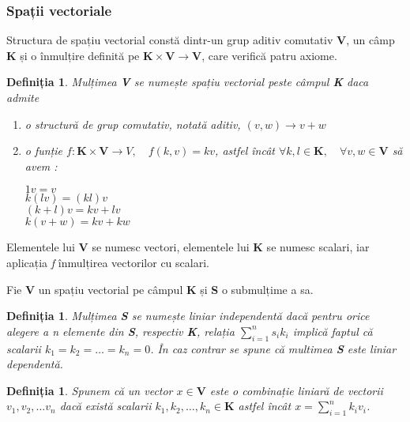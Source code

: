 \subsubsection{Spații vectoriale}
\label{ch1:sec_vectors:sub_vector_spaces:sub_sub_vectorspaces}
Structura de spațiu vectorial constă dintr-un grup aditiv comutativ \textbf{V},
un câmp \textbf{K} și o înmulțire definită pe $\mathbf{K \times V} \rightarrow
\mathbf{V}$, care verifică patru axiome.
\newtheorem{def_vectorspaces}[def_dotproduct]{Definiția}
\begin{def_vectorspaces}
Mulțimea \textbf{V} se numește spațiu vectorial peste câmpul \textbf{K} daca
admite
\begin{enumerate}
  \item o structură de grup comutativ, notată aditiv, $(v, w) \rightarrow v
  + w$
  \item o funție $f : \mathbf{K \times V} \rightarrow V, \quad f(k, v) = kv$,
  astfel încât $\forall k, l \in \mathbf{K}, \quad \forall v, w \in \mathbf{V}$
  să avem : \begin{center}
  $1v = v$ \\ $k(lv) = (kl)v$ \\ $(k + l)v = kv + lv$ \\ $k(v + w) = kv + kw$
  \end{center}  
\end{enumerate}
\end{def_vectorspaces}
Elementele lui \textbf{V} se numesc vectori, elementele lui \textbf{K}
se numesc scalari, iar aplicația \textit{f} înmulțirea vectorilor cu scalari.

Fie \textbf{V} un spațiu vectorial pe câmpul \textbf{K} și \textbf{S} o
submulțime a sa.
\newtheorem{th_liniar_independent}[def_dotproduct]{Definiția}
\begin{th_liniar_independent}
Mulțimea \textbf{S} se numește liniar independentă dacă pentru orice alegere a n
elemente din \textbf{S}, respectiv \textbf{K}, relația $\sum_{i = 1}^{n}s_ik_i$
implică faptul că scalarii $k_1 = k_2 = \dots = k_n = 0$. În caz contrar se
spune că multimea \textbf{S} este liniar dependentă.
\end{th_liniar_independent}

\newtheorem{th_liniar_comb}[def_dotproduct]{Definiția}
\begin{th_liniar_comb}
Spunem că un vector $x \in \mathbf{V}$ este o combinație liniară de vectorii
$v_1, v_2, \dots v_n$ dacă există scalarii $k_1, k_2, \dots, k_n \in \mathbf{K}$
astfel încât $x = \sum_{i = 1}^{n} k_iv_i$.
\end{th_liniar_comb}

